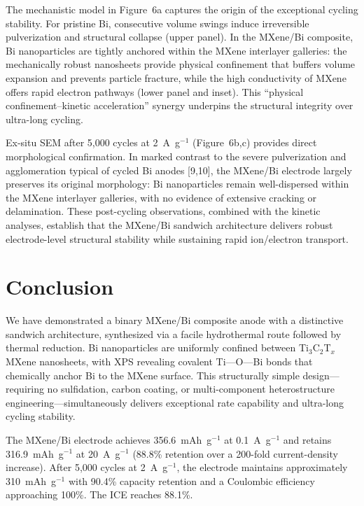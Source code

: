 The mechanistic model in Figure~6a captures the origin of the exceptional cycling stability. For pristine Bi, consecutive volume swings induce irreversible pulverization and structural collapse (upper panel). In the MXene/Bi composite, Bi nanoparticles are tightly anchored within the MXene interlayer galleries: the mechanically robust nanosheets provide physical confinement that buffers volume expansion and prevents particle fracture, while the high conductivity of MXene offers rapid electron pathways (lower panel and inset). This ``physical confinement--kinetic acceleration'' synergy underpins the structural integrity over ultra-long cycling.

Ex-situ SEM after 5,000 cycles at 2~A~g$^{-1}$ (Figure~6b,c) provides direct morphological confirmation. In marked contrast to the severe pulverization and agglomeration typical of cycled Bi anodes [9,10], the MXene/Bi electrode largely preserves its original morphology: Bi nanoparticles remain well-dispersed within the MXene interlayer galleries, with no evidence of extensive cracking or delamination. These post-cycling observations, combined with the kinetic analyses, establish that the MXene/Bi sandwich architecture delivers robust electrode-level structural stability while sustaining rapid ion/electron transport.

\section{Conclusion}

We have demonstrated a binary MXene/Bi composite anode with a distinctive sandwich architecture, synthesized via a facile hydrothermal route followed by thermal reduction. Bi nanoparticles are uniformly confined between Ti$_{3}$C$_{2}$T$_{x}$ MXene nanosheets, with XPS revealing covalent Ti---O---Bi bonds that chemically anchor Bi to the MXene surface. This structurally simple design---requiring no sulfidation, carbon coating, or multi-component heterostructure engineering---simultaneously delivers exceptional rate capability and ultra-long cycling stability.

The MXene/Bi electrode achieves 356.6~mAh~g$^{-1}$ at 0.1~A~g$^{-1}$ and retains 316.9~mAh~g$^{-1}$ at 20~A~g$^{-1}$ (88.8\% retention over a 200-fold current-density increase). After 5,000 cycles at 2~A~g$^{-1}$, the electrode maintains approximately 310~mAh~g$^{-1}$ with 90.4\% capacity retention and a Coulombic efficiency approaching 100\%. The ICE reaches 88.1\%.

